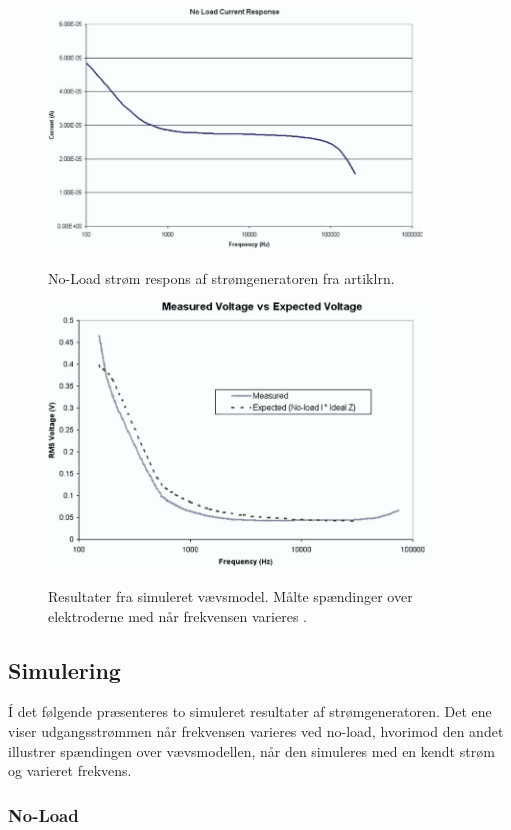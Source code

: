\begin{figure}[H]
\centering
{\includegraphics[width=10cm]
{Figure/oprindeligenoload}}
\caption{No-Load strøm respons af strømgeneratoren fra  artiklrn\cite{Aroom2009}.}
\label{fig:oprindeligeonload}
\end{figure}




\begin{figure}[H]
\centering
{\includegraphics[width=10cm]
{Figure/oprindeligerms}}
\caption{Resultater fra simuleret vævsmodel. Målte spændinger over elektroderne med når frekvensen varieres \citep{Aroom2009}.}
\label{fig:oprindeligerms}
\end{figure}


\subsection{Simulering}
Í det følgende præsenteres to simuleret resultater af strømgeneratoren. Det ene viser udgangsstrømmen når frekvensen varieres ved no-load, hvorimod den andet illustrer spændingen over vævsmodellen, når den simuleres med en kendt strøm og varieret frekvens. 
 


\subsubsection{No-Load}

